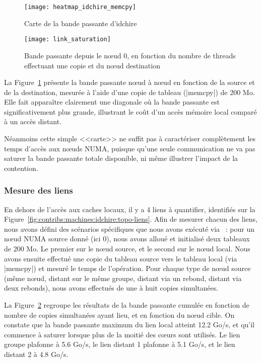 \begin{figure}[t!]
  \centering
  \texttt{[image: heatmap\_idchire\_memcpy]}
  \caption{Carte de la bande passante d'idchire}\label{fig:contribs:machines:idchire:heatmap}
\end{figure}

\begin{figure}[h!]
  \centering
  \texttt{[image: link\_saturation]}
  \caption{Bande passante depuis le nœud 0, en fonction du nombre de threads effectuant une copie et du nœud destination}\label{fig:contribs:machines:idchire:saturation}
\end{figure}


La Figure~\ref{fig:contribs:machines:idchire:heatmap} présente la bande passante nœud à nœud en fonction de la source et de la destination, mesurée à l'aide d'une copie de tableau (|memcpy|) de 200 Mo.
Elle fait apparaître clairement une diagonale où la bande passante est significativement plus grande, illustrant le coût d'un accès mémoire local comparé à un accès distant.

Néanmoins cette simple <<carte>> ne suffit pas à caractériser complètement les temps d'accès aux nœuds NUMA, puisque qu'une seule communication ne va pas saturer la bande passante totale disponible, ni même illustrer l'impact de la contention.


\subsubsection{Mesure des liens}\label{sec:contribs:machines:idchire:liens}

En dehors de l'accès aux caches locaux, il y a 4 liens à quantifier, identifiés sur la Figure~\ref{fig:contribs:machines:idchire:topo-liens}.
Afin de mesurer chacun des liens, nous avons défini des scénarios spécifiques que nous avons exécuté via \outil~: pour un nœud NUMA source donné (ici 0), nous avons alloué et initialisé deux tableaux de 200 Mo. Le premier sur le nœud source, et le second sur le nœud local. Nous avons ensuite effectué une copie du tableau source vers le tableau local (via |memcpy|) et mesuré le temps de l'opération.
Pour chaque type de nœud source (même nœud, distant sur le même groupe, distant via un rebond, distant via deux rebonds), nous avons effectués de une à huit copies simultanées.


La Figure~\ref{fig:contribs:machines:idchire:saturation} regroupe les résultats de la bande passante cumulée en fonction de nombre de copies simultanées ayant lieu, et en fonction du nœud cible.
On constate que la bande passante maximum du lien local atteint 12.2 Go/s, et qu'il commence à saturer lorsque plus de la moitié des cœurs sont utilisés.
Le lien groupe plafonne à 5.6 Go/s, le lien distant 1 plafonne à 5.1 Go/s, et le lien distant 2 à 4.8 Go/s.


